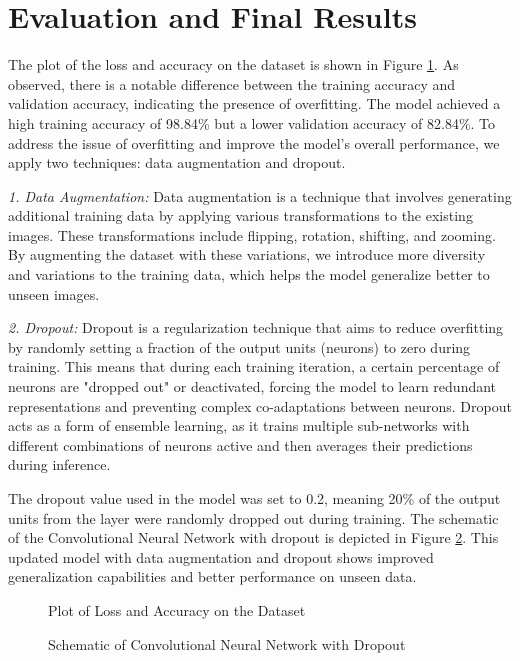 \documentclass[11pt,a4paper]{article}
\begin{document}
\section{Evaluation and Final Results} 
The plot of the loss and accuracy on the dataset is shown in Figure \ref{cnn_loss}. As observed, there is a notable difference between the training accuracy and validation accuracy, indicating the presence of overfitting. The model achieved a high training accuracy of 98.84\% but a lower validation accuracy of 82.84\%. To address the issue of overfitting and improve the model's overall performance, we apply two techniques: data augmentation and dropout.

\emph{1. Data Augmentation:}
   Data augmentation is a technique that involves generating additional training data by applying various transformations to the existing images. These transformations include flipping, rotation, shifting, and zooming. By augmenting the dataset with these variations, we introduce more diversity and variations to the training data, which helps the model generalize better to unseen images.

\emph{2. Dropout:}
   Dropout is a regularization technique that aims to reduce overfitting by randomly setting a fraction of the output units (neurons) to zero during training. This means that during each training iteration, a certain percentage of neurons are "dropped out" or deactivated, forcing the model to learn redundant representations and preventing complex co-adaptations between neurons. Dropout acts as a form of ensemble learning, as it trains multiple sub-networks with different combinations of neurons active and then averages their predictions during inference.

\noindent The dropout value used in the model was set to 0.2, meaning 20\% of the output units from the layer were randomly dropped out during training. The schematic of the Convolutional Neural Network with dropout is depicted in Figure \ref{dropout_schema}. This updated model with data augmentation and dropout shows improved generalization capabilities and better performance on unseen data.

\begin{figure}[htbp]
  \centering
  \caption{Plot of Loss and Accuracy on the Dataset}
  \label{cnn_loss}
\end{figure}

\begin{figure}[htbp]
  \centering
  \caption{Schematic of Convolutional Neural Network with Dropout}
  \label{dropout_schema}
\end{figure}
\end{document}
